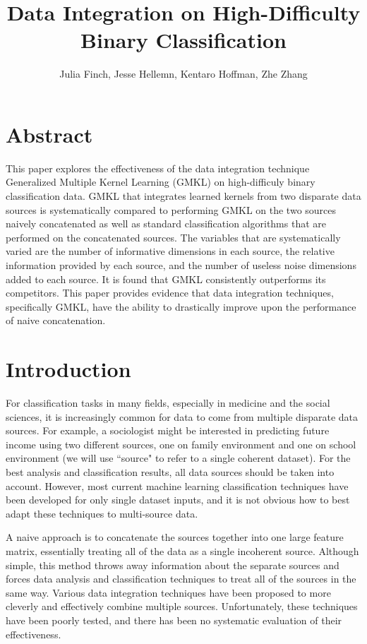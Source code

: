 \documentclass{article}
\begin{document}
\title{Data Integration on High-Difficulty Binary Classification}
\author{Julia Finch, Jesse Hellemn, Kentaro Hoffman, Zhe Zhang}
\maketitle


\section*{Abstract}

This paper explores the effectiveness of the data integration technique Generalized Multiple Kernel Learning (GMKL) on high-difficuly binary classification data. GMKL that integrates learned kernels from two disparate data sources is systematically compared to performing GMKL on the two sources naively concatenated as well as standard classification algorithms that are performed on the concatenated sources. The variables that are systematically varied are the number of informative dimensions in each source, the relative information provided by each source, and the number of useless noise dimensions added to each source. It is found that GMKL consistently outperforms its competitors. This paper provides evidence that data integration techniques, specifically GMKL, have the ability to drastically improve upon the performance of naive concatenation.

\section*{Introduction}
For classification tasks in many fields, especially in medicine and the social
sciences, it is increasingly common for data to come from multiple disparate
data sources. For example, a sociologist might be interested in predicting
future income using two different sources, one on family environment and one on
school environment (we will use ``source" to refer to a single coherent
dataset). For the best analysis and classification results, all data sources
should be taken into account. However, most current machine learning
classification techniques have been developed for only single dataset inputs,
and it is not obvious how to best adapt these techniques to multi-source data.

A naive approach is to concatenate the sources together into one large feature
matrix, essentially treating all of the data as a single incoherent source.
Although simple, this method throws away
information about the separate sources and forces data analysis and
classification techniques to treat all of the sources in the same way. Various
data integration techniques have been proposed to more cleverly and effectively
combine multiple sources. Unfortunately, these techniques have been poorly
tested, and there has been no systematic evaluation of their effectiveness.
\end{document}
